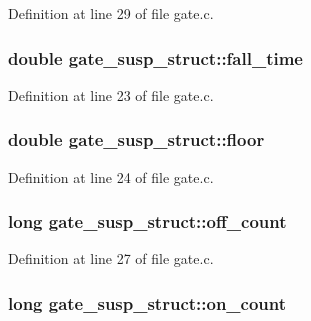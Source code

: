 Definition at line 29 of file gate.\+c.

\subsubsection[{\texorpdfstring{fall\+\_\+time}{fall_time}}]{\setlength{\rightskip}{0pt plus 5cm}double gate\+\_\+susp\+\_\+struct\+::fall\+\_\+time}\hypertarget{structgate__susp__struct_a587d7890f2c0427ba46362046a7be2f8}{}\label{structgate__susp__struct_a587d7890f2c0427ba46362046a7be2f8}


Definition at line 23 of file gate.\+c.

\subsubsection[{\texorpdfstring{floor}{floor}}]{\setlength{\rightskip}{0pt plus 5cm}double gate\+\_\+susp\+\_\+struct\+::floor}\hypertarget{structgate__susp__struct_ab57cbc8b034c3b7bf3685b715a3f597e}{}\label{structgate__susp__struct_ab57cbc8b034c3b7bf3685b715a3f597e}


Definition at line 24 of file gate.\+c.

\subsubsection[{\texorpdfstring{off\+\_\+count}{off_count}}]{\setlength{\rightskip}{0pt plus 5cm}long gate\+\_\+susp\+\_\+struct\+::off\+\_\+count}\hypertarget{structgate__susp__struct_a3be53d80c51a5e9758681a90f2b764b8}{}\label{structgate__susp__struct_a3be53d80c51a5e9758681a90f2b764b8}


Definition at line 27 of file gate.\+c.

\subsubsection[{\texorpdfstring{on\+\_\+count}{on_count}}]{\setlength{\rightskip}{0pt plus 5cm}long gate\+\_\+susp\+\_\+struct\+::on\+\_\+count}\hypertarget{structgate__susp__struct_a03e2eda77d26844d83c52d272d4f09ec}{}\label{structgate__susp__struct_a03e2eda77d26844d83c52d272d4f09ec}


